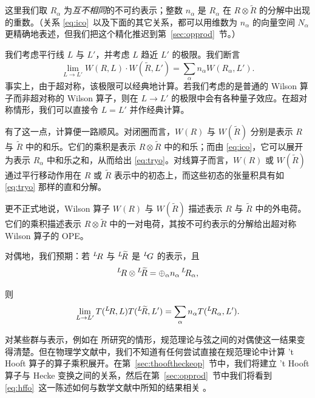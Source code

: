这里我们取 $R_\alpha$ 为{\it 互不相同}的不可约表示；整数 $n_\alpha$ 是 $R_\alpha$ 在 $R\otimes \tilde R$ 的分解中出现的重数。（关系 \eqref{eq:ico}\ 以及下面的其它关系，都可以用维数为 $n_\alpha$ 的向量空间 $N_\alpha$ 更精确地表述，但我们把这个精化推迟到第~\ref{sec:opprod}~节。）

我们考虑平行线 $L$ 与 $L'$，并考虑 $L$ 趋近 $L'$ 的极限。我们断言 %
\setcounter{equation}{26}
\begin{equation}\label{eq:tryo}
\lim_{L\to
L'}W(R,L)\cdot W(\tilde R,L')=\sum_\alpha n_\alpha W(R_\alpha,L').
\end{equation}
 事实上，由于超对称，该极限可以经典地计算。若我们考虑的是普通的 Wilson 算子而非超对称的 Wilson 算子，则在 $L\to L'$ 的极限中会有各种量子效应。在超对称情形，我们可以直接令 $L=L'$ 并作经典计算。

有了这一点，计算便一路顺风。对闭圈而言，$W(R)$ 与 $W({\tilde R})$ 分别是表示 $R$ 与 $\tilde R$ 中的和乐。它们的乘积是表示 $R\otimes \tilde R$ 中的和乐；而由 \eqref{eq:ico}，它可以展开为表示 $R_\alpha$ 中和乐之和，从而给出 \eqref{eq:tryo}。对线算子而言，$W(R)$ 或 $W(\tilde R)$ 通过平行移动作用在 $R$ 或 $\tilde R$ 表示中的初态上，而这些初态的张量积具有如 \eqref{eq:tryo} 那样的直和分解。

更不正式地说，Wilson 算子 $W(R)$ 与 $W(\tilde R)$ 描述表示 $R$ 与 $\tilde R$ 中的外电荷。它们的乘积描述表示 $R\otimes\tilde R$ 中的一对电荷，其按不可约表示的分解给出超对称 Wilson 算子的 OPE。

对偶地，我们预期：若 $^L\negthinspace R$ 与 $^L\negthinspace{\tilde R}$ 是 $^L\negthinspace G$ 的表示，且 %
\setcounter{equation}{27}
\begin{equation}\label{eq:itro}
^L\negthinspace R\otimes{}
^L\negthinspace\tilde R=\oplus_\alpha n_\alpha\, {}^L\negthinspace R_\alpha,
\end{equation}

则 %
\setcounter{equation}{28}
\begin{equation}\label{eq:hffo}
\lim_{L\to L'}T({}^L\negthinspace
R,L)T({}^L\negthinspace\tilde R,L')=\sum_\alpha n_\alpha T({}^L\negthinspace
R_\alpha,L').
\end{equation}


对某些群与表示，例如在 \cite{ref86,ref87} 所研究的情形，规范理论与弦之间的对偶使这一结果变得清楚。但在物理学文献中，我们不知道有任何尝试直接在规范理论中计算 't Hooft 算子的算子乘积展开。在第~\ref{sec:thooftheckeop}~节中，我们将建立 't Hooft 算子与 Hecke 变换之间的关系，然后在第~\ref{sec:opprod}~节中我们将看到 \eqref{eq:hffo}\ 这一陈述如何与数学文献中所知的结果相关 \cite{ref97,ref98}。

